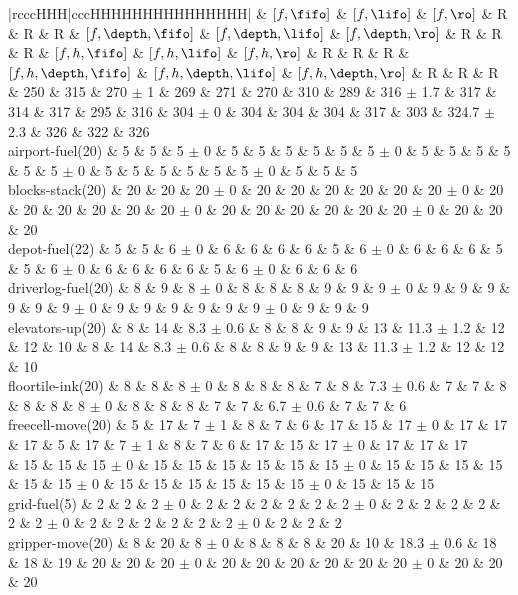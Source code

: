 \begin{center}
\begin{tabular}{|rcccHHH|cccHHHHHHHHHHHHHHH|}
 & \([f,\fifo]\) & \([f,\lifo]\) & \([f,\ro]\) & R & R & R & \([f,\depth,\fifo]\) & \([f,\depth,\lifo]\) & \([f,\depth,\ro]\) & R & R & R & \([f,h,\fifo]\) & \([f,h,\lifo]\) & \([f,h,\ro]\) & R & R & R & \([f,h,\depth,\fifo]\) & \([f,h,\depth,\lifo]\) & \([f,h,\depth,\ro]\) & R & R & R\\
\hline
 & 250 & 315 & 270 \(\pm\) 1 & 269 & 271 & 270 & 310 & 289 & 316 \(\pm\) 1.7 & 317 & 314 & 317 & 295 & 316 & 304 \(\pm\) 0 & 304 & 304 & 304 & 317 & 303 & 324.7 \(\pm\) 2.3 & 326 & 322 & 326\\
\hline
airport-fuel(20) & 5 & 5 & 5 \(\pm\) 0 & 5 & 5 & 5 & 5 & 5 & 5 \(\pm\) 0 & 5 & 5 & 5 & 5 & 5 & 5 \(\pm\) 0 & 5 & 5 & 5 & 5 & 5 & 5 \(\pm\) 0 & 5 & 5 & 5\\
blocks-stack(20) & 20 & 20 & 20 \(\pm\) 0 & 20 & 20 & 20 & 20 & 20 & 20 \(\pm\) 0 & 20 & 20 & 20 & 20 & 20 & 20 \(\pm\) 0 & 20 & 20 & 20 & 20 & 20 & 20 \(\pm\) 0 & 20 & 20 & 20\\
depot-fuel(22) & 5 & 5 & 6 \(\pm\) 0 & 6 & 6 & 6 & 6 & 5 & 6 \(\pm\) 0 & 6 & 6 & 6 & 5 & 5 & 6 \(\pm\) 0 & 6 & 6 & 6 & 6 & 5 & 6 \(\pm\) 0 & 6 & 6 & 6\\
driverlog-fuel(20) & 8 & 9 & 8 \(\pm\) 0 & 8 & 8 & 8 & 9 & 9 & 9 \(\pm\) 0 & 9 & 9 & 9 & 9 & 9 & 9 \(\pm\) 0 & 9 & 9 & 9 & 9 & 9 & 9 \(\pm\) 0 & 9 & 9 & 9\\
elevators-up(20) & 8 & 14 & 8.3 \(\pm\) 0.6 & 8 & 8 & 9 & 9 & 13 & 11.3 \(\pm\) 1.2 & 12 & 12 & 10 & 8 & 14 & 8.3 \(\pm\) 0.6 & 8 & 8 & 9 & 9 & 13 & 11.3 \(\pm\) 1.2 & 12 & 12 & 10\\
floortile-ink(20) & 8 & 8 & 8 \(\pm\) 0 & 8 & 8 & 8 & 7 & 8 & 7.3 \(\pm\) 0.6 & 7 & 7 & 8 & 8 & 8 & 8 \(\pm\) 0 & 8 & 8 & 8 & 7 & 7 & 6.7 \(\pm\) 0.6 & 7 & 7 & 6\\
freecell-move(20) & 5 & 17 & 7 \(\pm\) 1 & 8 & 7 & 6 & 17 & 15 & 17 \(\pm\) 0 & 17 & 17 & 17 & 5 & 17 & 7 \(\pm\) 1 & 8 & 7 & 6 & 17 & 15 & 17 \(\pm\) 0 & 17 & 17 & 17\\
 & 15 & 15 & 15 \(\pm\) 0 & 15 & 15 & 15 & 15 & 15 & 15 \(\pm\) 0 & 15 & 15 & 15 & 15 & 15 & 15 \(\pm\) 0 & 15 & 15 & 15 & 15 & 15 & 15 \(\pm\) 0 & 15 & 15 & 15\\
grid-fuel(5) & 2 & 2 & 2 \(\pm\) 0 & 2 & 2 & 2 & 2 & 2 & 2 \(\pm\) 0 & 2 & 2 & 2 & 2 & 2 & 2 \(\pm\) 0 & 2 & 2 & 2 & 2 & 2 & 2 \(\pm\) 0 & 2 & 2 & 2\\
gripper-move(20) & 8 & 20 & 8 \(\pm\) 0 & 8 & 8 & 8 & 20 & 10 & 18.3 \(\pm\) 0.6 & 18 & 18 & 19 & 20 & 20 & 20 \(\pm\) 0 & 20 & 20 & 20 & 20 & 20 & 20 \(\pm\) 0 & 20 & 20 & 20\\

\end{tabular}
\end{center}
